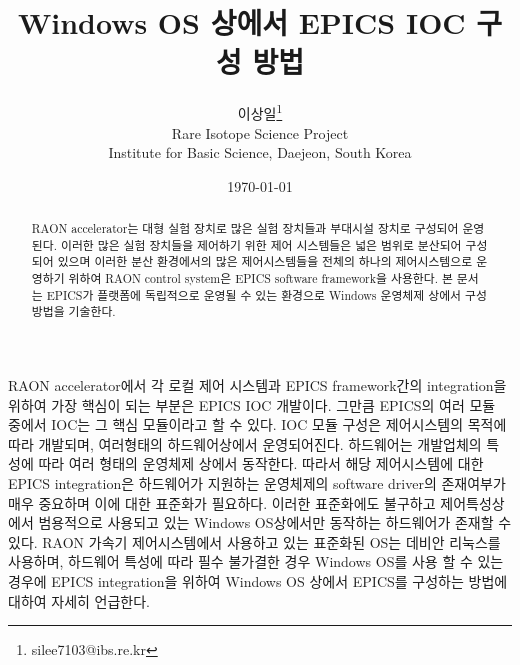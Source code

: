 \documentclass[11pt
  , a4paper
  , article
  , oneside
]{memoir}
\begin{document}
\newcommand{\technumber}{
  RAON Control-Document Series\\
  Revision : v1.0,   Release : 2014-12-24 fixed date}
\title{\textbf{Windows OS 상에서 EPICS IOC 구성 방법}}

\author{이상일\thanks{silee7103@ibs.re.kr} \\

  Rare Isotope Science Project\\
  Institute for Basic Science, Daejeon, South Korea
}
\date{\today}

\renewcommand{\maketitlehooka}{\begin{flushright}\textsf{\technumber}\end{flushright}}

\maketitle

\begin{abstract}
RAON accelerator는 대형 실험 장치로 많은 실험 장치들과 부대시설 장치로 구성되어 운영된다. 이러한 많은 실험 장치들을 제어하기 위한 제어 시스템들은 넓은 범위로 분산되어 구성되어 있으며 이러한 분산 환경에서의 많은 제어시스템들을 전체의 하나의 제어시스템으로 운영하기 위하여 RAON control system은 EPICS software framework을 사용한다. 본 문서는 EPICS가 플랫폼에 독립적으로 운영될 수 있는 환경으로 Windows 운영체제 상에서 구성 방법을 기술한다. 
\end{abstract}

RAON accelerator에서 각 로컬 제어 시스템과 EPICS framework간의 integration을 위하여 가장 핵심이 되는 부분은 EPICS IOC 개발이다. 그만큼 EPICS의 여러 모듈 중에서 IOC는 그 핵심 모듈이라고 할 수 있다. IOC 모듈 구성은 제어시스템의 목적에 따라 개발되며, 여러형태의 하드웨어상에서 운영되어진다. 하드웨어는 개발업체의 특성에 따라 여러 형태의 운영체제 상에서 동작한다. 따라서 해당 제어시스템에 대한 EPICS integration은 하드웨어가 지원하는 운영체제의 software driver의 존재여부가 매우 중요하며 이에 대한 표준화가 필요하다. 이러한 표준화에도 불구하고 제어특성상에서 범용적으로 사용되고 있는 Windows OS상에서만 동작하는 하드웨어가 존재할 수 있다. RAON 가속기 제어시스템에서 사용하고 있는 표준화된 OS는 데비안 리눅스를 사용하며, 하드웨어 특성에 따라 필수 불가결한 경우 Windows OS를 사용 할 수 있는 경우에 EPICS integration을 위하여 Windows OS 상에서 EPICS를 구성하는 방법에 대하여 자세히 언급한다.
\end{document}
